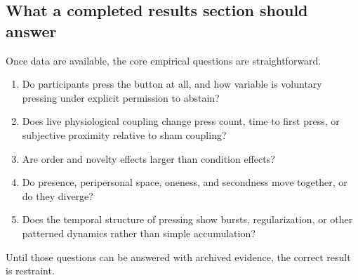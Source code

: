 \subsection{What a completed results section should answer}

Once data are available, the core empirical questions are straightforward.

\begin{enumerate}
\item Do participants press the button at all, and how variable is voluntary pressing under explicit permission to abstain?
\item Does live physiological coupling change press count, time to first press, or subjective proximity relative to sham coupling?
\item Are order and novelty effects larger than condition effects?
\item Do presence, peripersonal space, oneness, and secondness move together, or do they diverge?
\item Does the temporal structure of pressing show bursts, regularization, or other patterned dynamics rather than simple accumulation?
\end{enumerate}

Until those questions can be answered with archived evidence, the correct result is restraint.
